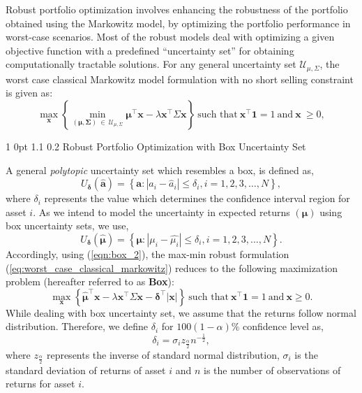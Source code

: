 \documentclass[12pt]{article}
\makeatletter
\numberwithin{equation}{section}
\renewcommand{\subsection}{
  \@startsection
  {subsection}%
  {1}%
  {0pt}%
  {1.1\baselineskip}%
  {0.2\baselineskip}%
  {\sc \centering}%
}
\makeatother
\begin{document}
Robust portfolio optimization involves enhancing the robustness of the portfolio obtained using the Markowitz model, by optimizing the portfolio performance in worst-case scenarios. Most of the robust models deal with optimizing a given objective function with a predefined ``uncertainty set'' for obtaining computationally tractable solutions. For any general uncertainty set $\displaystyle{\mathcal{U}_{\mu,\Sigma}}$, the worst case classical Markowitz model formulation \cite{Halldorsson03,Kim14} with no short selling constraint is given as:
\begin{equation}
\label{eq:worst_case_classical_markowitz}
\max\limits_{\mathbf{x}}\left\{\min\limits_{\left(\boldsymbol{\mu},\boldsymbol{\Sigma}\right)~\in~\mathcal{U}_{\mu,\Sigma}}\boldsymbol{\mu}^{\top}\mathbf{x}
-\lambda\mathbf{x^{\top}}\Sigma\mathbf{x}\right\}~\text{such that}~\mathbf{x^{\top}}\mathbf{1}=1~\text{and}~\mathbf{x}~\geq 0,
\end{equation}

\subsection{Robust Portfolio Optimization with Box Uncertainty Set}

A general \textit{polytopic} \cite{Fabozzi07} uncertainty set which resembles a box, is defined as,
\begin{equation}
\label{eqn:box_1}
U_{\boldsymbol{\delta}}(\mathbf{\hat{a}})=\left\{\mathbf{a}:\left|a_{i}-\hat{a}_{i}\right| \leq \delta_{i}, i=1,2,3,\dots,N\right\},
\end{equation}
where $\delta_{i}$ represents the value which determines the confidence interval region for asset $i$. As we intend to model the uncertainty in expected returns $\left(\boldsymbol{\mu}\right)$ using box uncertainty sets, we use,
\begin{equation}
\label{eqn:box_2}
U_{\boldsymbol{\delta}}(\boldsymbol{\hat{\mu}})=\left\{\boldsymbol{\mu}: \left|\mu_{i}-\hat{\mu_{i}}\right|\leq \delta_{i}, i=1,2,3,\dots,N \right\}.
\end{equation}
Accordingly, using (\ref{eqn:box_2}), the max-min robust formulation (\ref{eq:worst_case_classical_markowitz}) reduces to the following maximization problem
(hereafter referred to as \textbf{Box}):
\begin{equation}
\label{eqn:box_markowitz}
\max\limits_{\mathbf{x}}\left\{\boldsymbol{\hat{\mu}}^{\top}\mathbf{x}-\lambda\mathbf{x^{\top}}\Sigma\mathbf{x}-\boldsymbol{\delta}^{\top}|\mathbf{x}|\right\}
~\text{such that}~\mathbf{x^{\top}}\mathbf{1}=1~\text{and}~\mathbf{x} \geq 0.
\end{equation}
While dealing with box uncertainty set, we assume that the returns follow normal distribution. Therefore, we define $\delta_{i}$ for $100(1-\alpha)\%$ confidence level as, \[\displaystyle{\delta_{i}=\sigma_{i} z_{\frac{\alpha}{2}} n^{-\frac{1}{2}}},\]
where $z_{\frac{\alpha}{2}}$ represents the inverse of standard normal distribution, $\sigma_{i}$ is the standard deviation of returns of asset $i$ and $n$ is the number of observations of returns for asset $i$.
\end{document}
